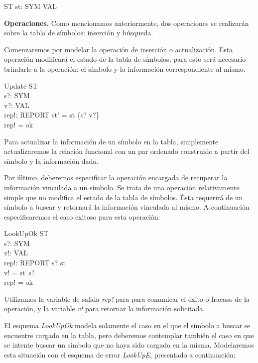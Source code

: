 \begin{schema}{ST}
st: SYM \pfun VAL
\end{schema}

\bigskip
\noindent
\textbf{Operaciones.} Como mencionamos anteriormente, dos operaciones se realizarán sobre la tabla de símbolos: inserción y búsqueda.

\bigskip
Comenzaremos por modelar la operación de inserción o actualización. Esta operación modificará el estado de la tabla de símbolos; para esto será necesario brindarle a la operación: el símbolo y la información correspondiente al mismo.

\begin{schema}{Update}
  \Delta ST \\
  s?: SYM \\
  v?: VAL \\
  rep!: REPORT
  \where
  st' = st \oplus \{s? \mapsto v?\} \\
  rep! = ok
\end{schema}


Para actualizar la información de un símbolo en la tabla, simplemente actualizaremos la relación funcional con un par ordenado construido a partir del símbolo y la información dada. 

Por último, deberemos especificar la operación encargada de recuperar la información vinculada a un símbolo. Se trata de una operación relativamente simple que no modifica el estado de la tabla de símbolos. Ésta requerirá de un símbolo a buscar y retornará la información vinculada al mismo. A continuación especificaremos el caso exitoso para esta operación:

\begin{schema}{LookUpOk}
\Xi ST \\
s?: SYM \\
v!: VAL \\
rep!: REPORT
\where
s? \in \dom st \\
v! = st~s? \\
rep! = ok
\end{schema} 

Utilizamos la variable de salida \emph{rep!} para para comunicar el éxito o fracaso de la operación, y la variable \emph{v!} para retornar la información solicitada. 

El esquema \emph{LookUpOk} modela solamente el caso en el que el símbolo a buscar se encuentre cargado en la tabla, pero deberemos contemplar también el caso en que se intente buscar un símbolo que no haya sido cargado en la misma. Modelaremos esta situación con el esquema de error \emph{LookUpE}, presentado a continuación:

